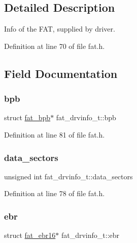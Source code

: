 \subsection{Detailed Description}
Info of the F\+AT, supplied by driver. 

Definition at line 70 of file fat.\+h.



\subsection{Field Documentation}
\mbox{\label{a00065_a5596cc2d01bcd3405718bee044412332_a5596cc2d01bcd3405718bee044412332}} 
\subsubsection{\texorpdfstring{bpb}{bpb}}
{\footnotesize\ttfamily struct \hyperlink{a00053}{fat\+\_\+bpb}$\ast$ fat\+\_\+drvinfo\+\_\+t\+::bpb}



Definition at line 81 of file fat.\+h.

\mbox{\label{a00065_a25e043cab40af89e54687fa100b1abf1_a25e043cab40af89e54687fa100b1abf1}} 
\subsubsection{\texorpdfstring{data\+\_\+sectors}{data\_sectors}}
{\footnotesize\ttfamily unsigned int fat\+\_\+drvinfo\+\_\+t\+::data\+\_\+sectors}



Definition at line 78 of file fat.\+h.

\mbox{\label{a00065_a825f02713bdb8c993368eaf7857eff16_a825f02713bdb8c993368eaf7857eff16}} 
\subsubsection{\texorpdfstring{ebr}{ebr}}
{\footnotesize\ttfamily struct \hyperlink{a00057}{fat\+\_\+ebr16}$\ast$ fat\+\_\+drvinfo\+\_\+t\+::ebr}



